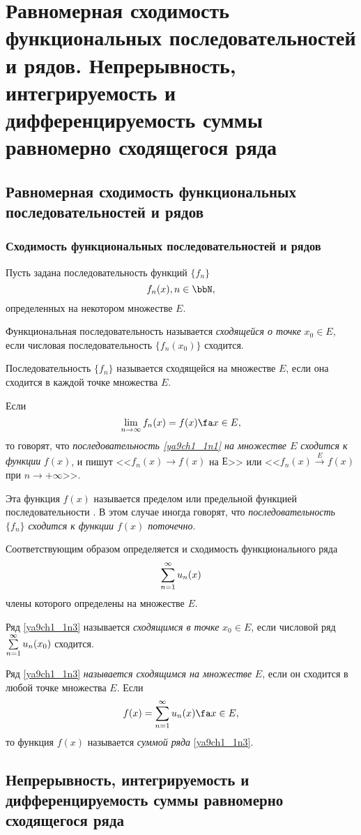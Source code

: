 \chapter{Равномерная сходимость функциональных последовательностей и рядов. Непрерывность, интегрируемость и дифференцируемость суммы равномерно сходящегося ряда}

\section{Равномерная сходимость функциональных последовательностей и рядов}

\subsection{Сходимость функциональных последовательностей и рядов}

Пусть задана последовательность функций $\{f_n\}$
\begin{equation} \label{ya9ch1_1n1}
f_n(x), n\in \bbN, 
\end{equation}
определенных на некотором множестве $E$.
\begin{defn} Функциональная последовательность называется \textit{сходящейся о точке} $x_0 \in E$, если числовая последовательность $\{f_n(x_0)\}$ сходится.

Последовательность $\{f_n\}$ называется сходящейся на множестве $E$, если она сходится в каждой точке множества $E$.

Если
\begin{equation} \label{ya9ch1_1n2}
\lim_{n \to \infty} f_n(x) = f(x) \fa x\in E,
\end{equation}
то говорят, что \textit{последовательность \eqref{ya9ch1_1n1} на множестве $E$ сходится к функции} $f(x)$, и пишут <<$f_n(x)\to f(x)$ на $Е$>> или <<$f_n(x) \xrightarrow{E} f(x)$ при $n \to +\infty $>>.

Эта функция $f(x)$ называется пределом или предельной функцией последовательности . В этом случае иногда говорят, что \textit{последовательность $\{f_n\}$ сходится к функции $f(x)$ поточечно}.
\end{defn}

Соответствующим образом определяется и сходимость функционального ряда
\begin{equation} \label{ya9ch1_1n3}
\sum_{n=1}^{\infty}\limits u_n(x)
\end{equation}
члены которого определены на множестве $E$.
\begin{defn} Ряд \eqref{ya9ch1_1n3} называется \textit{сходящимся в точке} $x_0 \in E$, если числовой ряд $\sum_{n=1}^{\infty}\limits u_n(x_0)$ сходится.

Ряд \eqref{ya9ch1_1n3} \textit{называется сходящимся на множестве} $E$, если он сходится в любой точке множества $E$. Если
\begin{equation} \label{ya9ch1_1n4}
f(x)=\sum_{n=1}^{\infty}\limits u_n(x) \fa x \in E,
\end{equation}
то функция $f(x)$ называется \textit{суммой ряда} \eqref{ya9ch1_1n3}.
\end{defn}

\section{Непрерывность, интегрируемость и дифференцируемость суммы равномерно сходящегося ряда}
